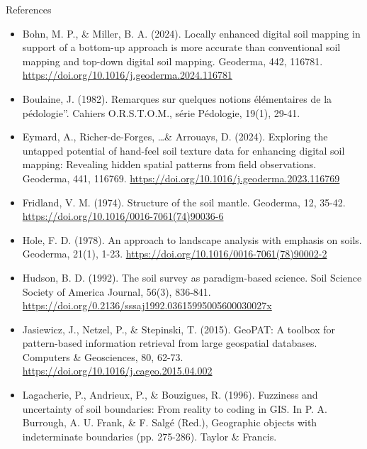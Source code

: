 \documentclass[aspectratio=169]{beamer}
\begin{document}
\begin{frame}[allowframebreaks]{References}


  \begin{scriptsize}
\begin{itemize}

  \item Bohn, M. P., \& Miller, B. A. (2024). Locally enhanced digital soil mapping in support of a bottom-up approach is more accurate than conventional soil mapping and top-down digital soil mapping. Geoderma, 442, 116781. \url{https://doi.org/10.1016/j.geoderma.2024.116781}

    \item Boulaine, J. (1982). Remarques sur quelques notions élémentaires de la pédologie”. Cahiers O.R.S.T.O.M., série Pédologie, 19(1), 29-41.

      \item Eymard, A., Richer-de-Forges, \ldots \& Arrouays, D. (2024). Exploring the untapped potential of hand-feel soil texture data for enhancing digital soil mapping: Revealing hidden spatial patterns from field observations. Geoderma, 441, 116769. \url{https://doi.org/10.1016/j.geoderma.2023.116769}

    
    \item Fridland, V. M. (1974). Structure of the soil mantle. Geoderma, 12, 35-42. \url{https://doi.org/10.1016/0016-7061(74)90036-6}

    \item Hole, F. D. (1978). An approach to landscape analysis with emphasis on soils. Geoderma, 21(1), 1-23. \url{https://doi.org/10.1016/0016-7061(78)90002-2}

    \item Hudson, B. D. (1992). The soil survey as paradigm-based science. Soil Science Society of America Journal, 56(3), 836-841. \url{https://doi.org/0.2136/sssaj1992.03615995005600030027x}


    \item Jasiewicz, J., Netzel, P., \& Stepinski, T. (2015). GeoPAT: A toolbox for pattern-based information retrieval from large geospatial databases. Computers \& Geosciences, 80, 62-73. \url{https://doi.org/10.1016/j.cageo.2015.04.002}


    \item Lagacherie, P., Andrieux, P., \& Bouzigues, R. (1996). Fuzziness and uncertainty of soil boundaries: From reality to coding in GIS. In P. A. Burrough, A. U. Frank, \& F. Salgé (Red.), Geographic objects with indeterminate boundaries (pp. 275-286). Taylor \& Francis.


\end{itemize}
\end{scriptsize}
\end{frame}
\end{document}
